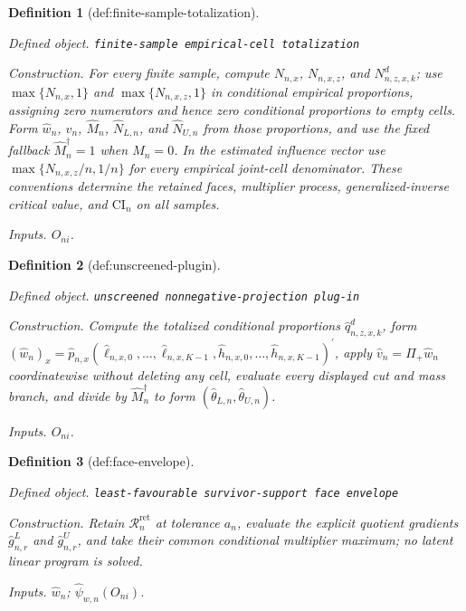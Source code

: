 \documentclass{article}
\newtheorem{definition}{Definition}
\begin{document}
\begin{definition}[def:finite-sample-totalization]\label{def:finite-sample-totalization}
\par\smallskip\noindent\emph{Defined object.} \texttt{finite-\allowbreak{}sample empirical-\allowbreak{}cell totalization}
\par\smallskip\noindent\emph{Construction.} For every finite sample, compute \(N_{n,x}\), \(N_{n,x,z}\), and \(N^d_{n,z,x,k}\); use \(\max\{N_{n,x},1\}\) and \(\max\{N_{n,x,z},1\}\) in conditional empirical proportions, assigning zero numerators and hence zero conditional proportions to empty cells. Form \(\widehat w_n\), \(\widehat v_n\), \(\widehat M_n\), \(\widehat N_{L,n}\), and \(\widehat N_{U,n}\) from those proportions, and use the fixed fallback \(\widehat M_n^{\dagger}=1\) when \(\widehat M_n=0\). In the estimated influence vector use \(\max\{N_{n,x,z}/n,1/n\}\) for every empirical joint-cell denominator. These conventions determine the retained faces, multiplier process, generalized-inverse critical value, and \(\mathrm{CI}_n\) on all samples.
\par\smallskip\noindent\emph{Inputs.} \(O_{ni}\).
\end{definition}

\begin{definition}[def:unscreened-plugin]\label{def:unscreened-plugin}
\par\smallskip\noindent\emph{Defined object.} \texttt{unscreened nonnegative-\allowbreak{}projection plug-\allowbreak{}in}
\par\smallskip\noindent\emph{Construction.} Compute the totalized conditional proportions \(\widehat q^d_{n,z,x,k}\), form \((\widehat w_n)_x=\widehat p_{n,x}(\widehat\ell_{n,x,0},\ldots,\widehat\ell_{n,x,K-1},\widehat h_{n,x,0},\ldots,\widehat h_{n,x,K-1})^{\prime}\), apply \(\widehat v_n=\Pi_+\widehat w_n\) coordinatewise without deleting any cell, evaluate every displayed cut and mass branch, and divide by \(\widehat M_n^{\dagger}\) to form \((\widehat\theta_{L,n},\widehat\theta_{U,n})\).
\par\smallskip\noindent\emph{Inputs.} \(O_{ni}\).
\end{definition}

\begin{definition}[def:face-envelope]\label{def:face-envelope}
\par\smallskip\noindent\emph{Defined object.} \texttt{least-\allowbreak{}favourable survivor-\allowbreak{}support face envelope}
\par\smallskip\noindent\emph{Construction.} Retain \(\mathcal R_n^{\mathrm{ret}}\) at tolerance \(a_n\), evaluate the explicit quotient gradients \(\widehat g^L_{n,r}\) and \(\widehat g^U_{n,r}\), and take their common conditional multiplier maximum; no latent linear program is solved.
\par\smallskip\noindent\emph{Inputs.} \(\widehat w_n\); \(\widehat\psi_{w,n}(O_{ni})\).
\end{definition}
\end{document}
